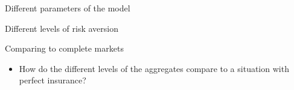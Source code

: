 \documentclass{beamer}
\begin{document}
\begin{frame}{Different parameters of the model}




\end{frame}

\begin{frame}{Different levels of risk aversion}




\end{frame}


\begin{frame}{Comparing to complete markets}
  \begin{itemize}
  
 
    \item {
  How do the different levels of the aggregates compare to a situation with perfect insurance? 
  }

  \end{itemize}
  
\end{frame}
  
\end{document}
